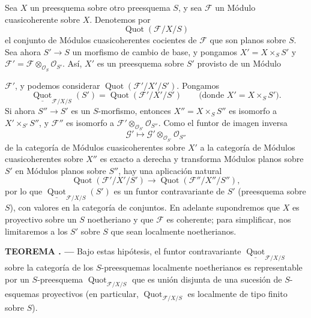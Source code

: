 \documentclass[11pt,twoside,openany]{book}
\numberwithin{equation}{section}
\newcommand{\src}[1]{%
  \phantomsection\hypertarget{src:#1}{}%
  \marginpar{\raggedleft\footnotesize\sffamily #1}%
}
\theoremstyle{plain}
\theoremstyle{definition}
\theoremstyle{remark}
\newcommand{\result}[2]{%
  \par\medskip\noindent\textbf{#1%
  \if\relax\detokenize{#2}\relax\else\space#2\fi. ---}\enspace
}
\newcommand{\FgaUnitKey}{frontmatter}
\renewcommand{\src}[1]{%
  \phantomsection\hypertarget{src:\FgaUnitKey:#1}{}%
  \marginpar{\raggedleft\footnotesize\sffamily #1}%
}
\theoremstyle{plain}
\theoremstyle{definition}
\theoremstyle{remark}
\begin{document}
Sea $X$ un preesquema sobre otro preesquema $S$, y sea $\mathcal F$ un Módulo
cuasicoherente sobre $X$. Denotemos por
\[
\operatorname{Quot}(\mathcal F/X/S)
\]
el conjunto de Módulos cuasicoherentes cocientes de $\mathcal F$ que son
planos sobre $S$. Sea ahora $S'\longrightarrow S$ un morfismo de cambio de
base, y pongamos $X'=X\times_S S'$ y
$\mathcal F'=\mathcal F\otimes_{\mathcal O_S}\mathcal O_{S'}$. Así, $X'$ es
un preesquema sobre $S'$ provisto de un Módulo
\src{259}
$\mathcal F'$, y podemos considerar
$\operatorname{Quot}(\mathcal F'/X'/S')$. Pongamos
\[
\underline{\operatorname{Quot}}_{\mathcal F/X/S}(S')
=\operatorname{Quot}(\mathcal F'/X'/S')
\qquad\text{(donde $X'=X\times_SS'$)}.
\]
Si ahora $S''\longrightarrow S'$ es un $S$-morfismo, entonces
$X''=X\times_SS''$ es isomorfo a $X'\times_{S'}S''$, y $\mathcal F''$ es
isomorfo a $\mathcal F'\otimes_{\mathcal O_{S'}}\mathcal O_{S''}$. Como el
funtor de imagen inversa
\[
\mathcal G'\longmapsto
\mathcal G'\otimes_{\mathcal O_{S'}}\mathcal O_{S''}
\]
de la categoría de Módulos cuasicoherentes sobre $X'$ a la categoría de
Módulos cuasicoherentes sobre $X''$ es exacto a derecha y transforma Módulos
planos sobre $S'$ en Módulos planos sobre $S''$, hay una aplicación natural
\[
\operatorname{Quot}(\mathcal F'/X'/S')\longrightarrow
\operatorname{Quot}(\mathcal F''/X''/S''),
\]
por lo que $\underline{\operatorname{Quot}}_{\mathcal F/X/S}(S')$ es un
funtor contravariante de $S'$ (preesquema sobre $S$), con valores en la
categoría de conjuntos. En adelante supondremos que $X$ es proyectivo sobre un
$S$ noetheriano y que $\mathcal F$ es coherente; para simplificar, nos
limitaremos a los $S'$ sobre $S$ que sean localmente noetherianos.

\result{TEOREMA}{3.1} Bajo estas hipótesis, el funtor contravariante
$\underline{\operatorname{Quot}}_{\mathcal F/X/S}$ sobre la categoría de los
$S$-preesquemas localmente noetherianos es representable por un $S$-preesquema
$\operatorname{Quot}_{\mathcal F/X/S}$ que es unión disjunta de una sucesión
de $S$-esquemas proyectivos (en particular,
$\operatorname{Quot}_{\mathcal F/X/S}$ es localmente de tipo finito sobre
$S$).
\end{document}
